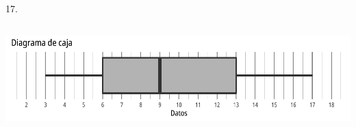 \documentclass{cdplf-prueba}
\begin{document}
\begin{tasks}
17.\end{tasks}
\subsection{}
\begin{center}\includegraphics{diagrama_caja_1.pdf}\end{center}
\end{document}
